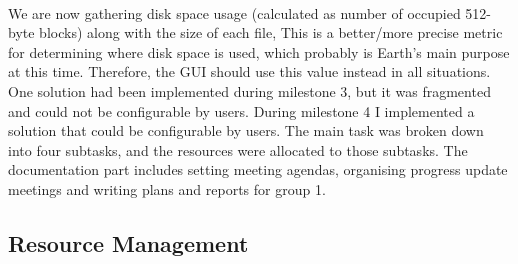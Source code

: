 \documentclass[10pt,a4,oneside]{article}
\begin{document}
\paragraph{}
We are now gathering disk space usage (calculated as number of occupied 512-byte blocks) along with the size of each file, This is a better/more precise metric for determining where disk space is used, which probably is Earth's main purpose at this time. Therefore, the GUI should use this value instead in all situations. One solution had been implemented during milestone 3, but it was fragmented and could not be configurable by users. During milestone 4 I implemented a solution that could be configurable by users. The main task was broken down into four subtasks, and the resources were allocated to those subtasks. The documentation part includes setting meeting agendas, organising progress update meetings and writing plans and reports for group 1.

\subsection*{Resource Management}
\end{document}

